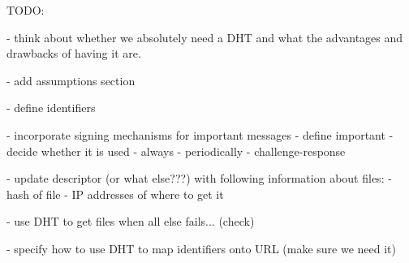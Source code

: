 TODO:

- think about whether we absolutely need a DHT and what the advantages
and drawbacks of having it are. 

- add assumptions section

- define identifiers

- incorporate signing mechanisms for important messages
   - define important 
   - decide whether it is used
       - always
       - periodically
       - challenge-response

- update descriptor (or  what else???) with following information
about files:
   - hash of file
   - IP addresses of where to get it

- use DHT to get files when all else fails... (check)

- specify how to use DHT to map identifiers onto URL (make sure we
need it)






























